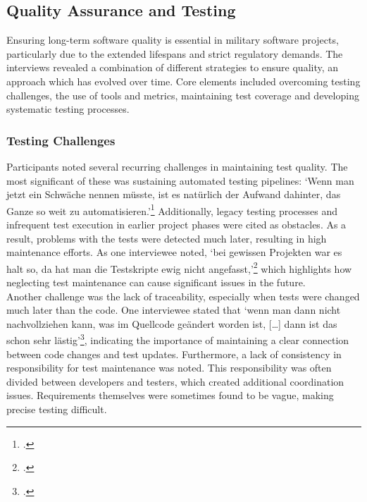 \subsection{Quality Assurance and Testing}
Ensuring long-term software quality is essential in military software projects, particularly due to the extended lifespans and strict regulatory demands. The interviews revealed a combination of different strategies to ensure quality, an approach which has evolved over time.
Core elements included overcoming testing challenges, the use of tools and metrics, maintaining test coverage and developing systematic testing processes.

\subsubsection{Testing Challenges}
Participants noted several recurring challenges in maintaining test quality. The most significant of these was sustaining automated testing pipelines: `Wenn man jetzt ein Schwäche nennen müsste, ist es natürlich der Aufwand dahinter, das Ganze so weit zu automatisieren.'\footcite{Interview32025}
Additionally, legacy testing processes and infrequent test execution in earlier project phases were cited as obstacles. As a result, problems with the tests were detected much later, resulting in high maintenance efforts. 
As one interviewee noted, `bei gewissen Projekten war es halt so, da hat man die Testskripte ewig nicht angefasst,'\footcite{Interview12025} which highlights how neglecting test maintenance can cause significant issues in the future.\\
Another challenge was the lack of traceability, especially when tests were changed much later than the code. One interviewee stated that `wenn man dann nicht nachvollziehen kann, was im Quellcode geändert worden ist, [\ldots] dann ist das schon sehr lästig'\footcite{Interview12025}, indicating
the importance of maintaining a clear connection between code changes and test updates. Furthermore, a lack of consistency in responsibility for test maintenance was noted.
This responsibility was often divided between developers and testers, which created additional coordination issues.
Requirements themselves were sometimes found to be vague, making precise testing difficult.\\

